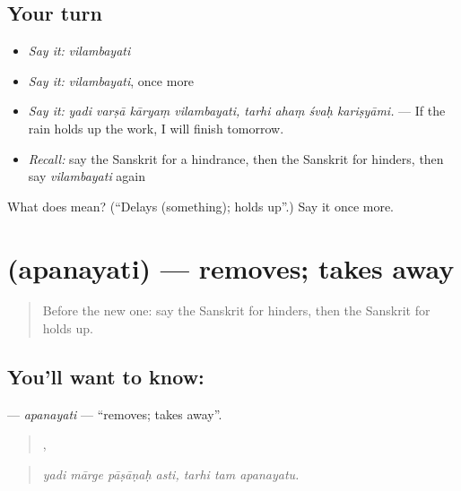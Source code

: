 \subsection*{Your turn}
\begin{itemize}
\raggedright
  \item \emph{Say it:} \emph{vilambayati}
  \item \emph{Say it:} \emph{vilambayati}, once more
  \item \emph{Say it:} \emph{yadi varṣā kāryaṃ vilambayati, tarhi ahaṃ śvaḥ kariṣyāmi.} — If the rain holds up the work, I will finish tomorrow.
  \item \emph{Recall:} say the Sanskrit for a hindrance, then the Sanskrit for hinders, then say \emph{vilambayati} again
\end{itemize}

\begin{tcolorbox}[breakable,colback=teal!4,colframe=teal!35!black,title={Before you move on}]
What does  mean? (\textquotedblleft{}Delays (something); holds up\textquotedblright{}.) Say it once more.
\end{tcolorbox}
\section[\texorpdfstring{\sk{अपनयति} (apanayati)}{अपनयति (apanayati)}]{ (apanayati) — removes; takes away}

\label{lesson:SA-C372-apanayati}



\begin{quote}
Before the new one: say the Sanskrit for hinders, then the Sanskrit for holds up.
\end{quote}

\subsection*{You'll want to know: }
\textbf{} — \emph{apanayati} — \textquotedblleft{}removes; takes away\textquotedblright{}.

\begin{quote}
   ,   
\end{quote}

\begin{quote}
\emph{yadi mārge pāṣāṇaḥ asti, tarhi tam apanayatu.}
\end{quote}


